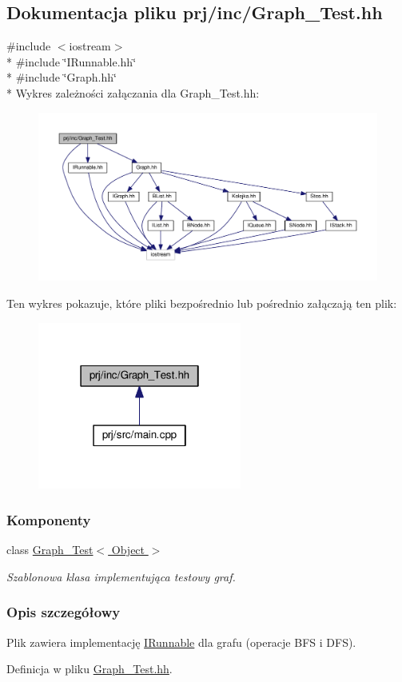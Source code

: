 \hypertarget{_graph___test_8hh}{\subsection{Dokumentacja pliku prj/inc/\-Graph\-\_\-\-Test.hh}
\label{_graph___test_8hh}
}
{\ttfamily \#include $<$iostream$>$}\\*
{\ttfamily \#include \char`\"{}I\-Runnable.\-hh\char`\"{}}\\*
{\ttfamily \#include \char`\"{}Graph.\-hh\char`\"{}}\\*
Wykres zależności załączania dla Graph\-\_\-\-Test.\-hh\-:
\nopagebreak
\begin{figure}[H]
\begin{center}
\leavevmode
\includegraphics[width=350pt]{_graph___test_8hh__incl}
\end{center}
\end{figure}
Ten wykres pokazuje, które pliki bezpośrednio lub pośrednio załączają ten plik\-:
\nopagebreak
\begin{figure}[H]
\begin{center}
\leavevmode
\includegraphics[width=190pt]{_graph___test_8hh__dep__incl}
\end{center}
\end{figure}
\subsubsection*{Komponenty}
\begin{DoxyCompactItemize}
\item 
class \hyperlink{class_graph___test}{Graph\-\_\-\-Test$<$ Object $>$}
\begin{DoxyCompactList}\small\item\em Szablonowa klasa implementująca testowy graf. \end{DoxyCompactList}\end{DoxyCompactItemize}


\subsubsection{Opis szczegółowy}
Plik zawiera implementację \hyperlink{class_i_runnable}{I\-Runnable} dla grafu (operacje B\-F\-S i D\-F\-S). 

Definicja w pliku \hyperlink{_graph___test_8hh_source}{Graph\-\_\-\-Test.\-hh}.

